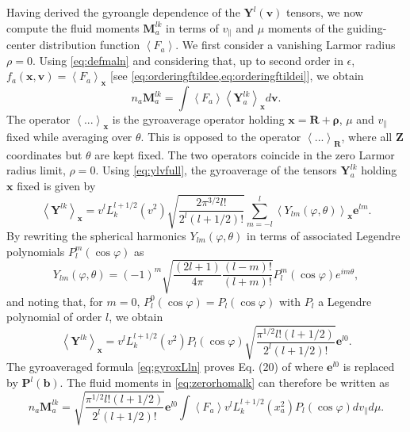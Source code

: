 Having derived the gyroangle dependence of the $\mathbf Y^{l}(\mathbf v)$ tensors, we now compute the fluid moments $\mathbf M_a^{lk}$ in terms of $v_\parallel$ and $\mu$ moments of the guiding-center distribution function $\left<F_a\right>$.
%
We first consider a vanishing Larmor radius $\rho=0$.
%
Using \cref{eq:defmaln} and considering that, up to second order in $\epsilon$, $f_a(\mathbf x, \mathbf v) = \left< F_a \right>_{\mathbf x}$ [see \cref{eq:orderingftildee,eq:orderingftildei}], we obtain
%
\begin{equation}
     n_a \mathbf{M}_a^{lk}= \int \left< F_a\right> \left<\mathbf Y_a^{lk}\right>_{\mathbf x} d\mathbf v.
\label{eq:zerorhomalk}
\end{equation}
%
The operator $\left< ... \right>_{\mathbf x}$ is the gyroaverage operator holding $\mathbf x=\mathbf R + \mathbf \rho$, $\mu$ and $v_\parallel$ fixed while averaging over $\theta$.
%
This is opposed to the operator $\left< ... \right>_{\mathbf R}$, where all $\mathbf Z$ coordinates but $\theta$ are kept fixed.
%
The two operators coincide in the zero Larmor radius limit, $\rho=0$.
%
Using \cref{eq:ylvfull}, the gyroaverage of the tensors $\mathbf Y_a^{lk}$ holding $\mathbf x$ fixed is given by
%
\begin{equation}
    \left< \mathbf Y^{lk} \right>_{\mathbf x} = v^l L_k^{l+1/2}(v^2) \sqrt{\frac{2\pi^{3/2}l!}{2^l(l+1/2)!}}\sum_{m=-l}^l \left< Y_{lm}(\varphi,\theta)\right>_{\mathbf x}\mathbf e^{l m}.
\end{equation}
%
By rewriting the spherical harmonics $Y_{lm}(\varphi,\theta)$ in terms of associated Legendre polynomials $P_{l}^m(\cos \varphi)$ as \citep{Abramowitz1972}
%
\begin{equation}
    Y_{lm}(\varphi,\theta) = (-1)^m\sqrt{\frac{(2l+1)}{4 \pi}\frac{(l-m)!}{(l+m)!}}P_{l}^m(\cos \varphi)e^{i m \theta},
\label{eq:ylmasslag}
\end{equation}
%
and noting that, for $m=0$, $P_{l}^0(\cos \varphi) = P_l(\cos \varphi)$ with $P_l$ a Legendre polynomial of order $l$, we obtain
\begin{equation}
    \left< \mathbf Y^{lk} \right>_{\mathbf x} = v^l L_k^{l+1/2}(v^2)  P_l(\cos \varphi) \sqrt{\frac{\pi^{1/2}l!(l+1/2)}{2^{l}(l+1/2)!}}\mathbf e^{l0}.
\label{eq:gyroxLln}
\end{equation}
%
The gyroaveraged formula \cref{eq:gyroxLln} proves Eq. (20) of \citet{Ji2006} where $\mathbf e^{l0}$ is replaced by $\mathbf P^l(\mathbf b)$.
%
The fluid moments in \cref{eq:zerorhomalk} can therefore be written as
%
\begin{equation}
     n_a \mathbf{M}_a^{lk}=\sqrt{\frac{\pi^{1/2}l!(l+1/2)}{2^{l}(l+1/2)!}}\mathbf e^{l0}\int \left< F_a\right> v^l L_k^{l+1/2}(x_a^2)  P_l(\cos \varphi) dv_\parallel d\mu.
\end{equation}
